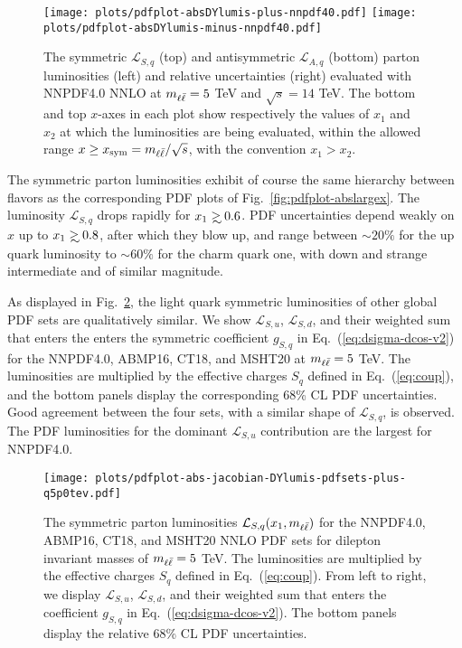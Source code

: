 \begin{figure}[!t]
 \centering
 \texttt{[image: plots/pdfplot-absDYlumis-plus-nnpdf40.pdf]}
 \texttt{[image: plots/pdfplot-absDYlumis-minus-nnpdf40.pdf]}
 \caption{The symmetric $\mathcal{L}_{S,q}$ (top)
   and antisymmetric $\mathcal{L}_{A,q}$ (bottom)
   parton
   luminosities (left) and relative uncertainties (right) evaluated with
   NNPDF4.0 NNLO at $m_{\ell\bar{\ell}}=5$ TeV and $\sqrt{s}=14$ TeV.
The bottom  and top $x$-axes in each plot show respectively the values
of $x_1$ and $x_2$  at which the
luminosities are being evaluated, within the allowed range
$x \ge x_{\rm sym}=m_{\ell\bar{\ell}}/\sqrt{s}$, with the convention $x_1>x_2$.}    
 \label{fig:pdfplot-absDYlumis-plus-nnpdf40}
\end{figure}

The symmetric parton luminosities exhibit of course the same hierarchy
between flavors
as the corresponding PDF plots of Fig.~\ref{fig:pdfplot-abslargex}. 
%
The luminosity $\mathcal{L}_{S,q}$  drops rapidly for
$x_1\gsim 0.6$. PDF  uncertainties  depend weakly on  $x$
up to $x_1\gsim 0.8$, after which they blow up, and range between $\sim 20\%$
for the up quark luminosity to $\sim 60\%$ for the charm quark one,
with down and strange intermediate and of similar magnitude.

As displayed in Fig.~\ref{fig:mll_dep_lumi_plus}, the light quark symmetric luminosities of other global PDF sets
are qualitatively similar.
%
We show $\mathcal{L}_{S,u}$,  $\mathcal{L}_{S,d}$,
and their weighted sum that enters the  enters the
symmetric coefficient $g_{S,q}$ in Eq.~(\ref{eq:dsigma-dcos-v2})
for the NNPDF4.0, ABMP16,
CT18, and MSHT20 at $m_{\ell\bar{\ell}}=5$ TeV.
%
The luminosities are multiplied by the effective charges
$S_q$ defined in Eq.~(\ref{eq:coup}),
and the bottom panels display the corresponding 68\% CL PDF uncertainties.
%
Good agreement between the four sets, with a similar shape
of $\mathcal{L}_{S,q}$, is observed.
%
The PDF luminosities for the dominant $\mathcal{L}_{S,u}$ contribution are the largest for NNPDF4.0.

\begin{figure}[!t]
 \centering
 \texttt{[image: plots/pdfplot-abs-jacobian-DYlumis-pdfsets-plus-q5p0tev.pdf]}
  \caption{The symmetric 
   parton luminosities $\mathcal{L}_{S,q}(x_1,m_{\ell\bar{\ell}})$ for the NNPDF4.0, ABMP16,
   CT18, and MSHT20 NNLO PDF sets for dilepton
   invariant masses of $m_{\ell\bar{\ell}}=5$ TeV.
   The luminosities are multiplied by the effective charges
   $S_q$ defined in Eq.~(\ref{eq:coup}).
   From left to right, we display $\mathcal{L}_{S,u}$,  $\mathcal{L}_{S,d}$,
   and their weighted sum that enters the  coefficient $g_{S,q}$ in Eq.~(\ref{eq:dsigma-dcos-v2}).
   The bottom panels display the relative 68\% CL PDF uncertainties.
    }    
 \label{fig:mll_dep_lumi_plus}
\end{figure}

